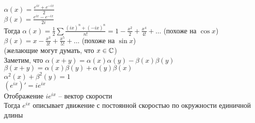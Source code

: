 \documentclass[12pt]{article}
\begin{document}
$\alpha(x) = \frac{e^{ix}+e^{-ix}}{2}$\\
$\beta(x) = \frac{e^{ix}-e^{-ix}}{2i}$\\
Тогда $\alpha(x) = \frac12 \sum\frac{(ix)^n+(-ix)^n}{n!} = 1 - \frac{x^2}{2} + \frac{x^4}{4!} + \ldots$ (похоже на $\cos x$)\\
$\beta(x) = x - \frac{x^3}{3!} + \frac{x^5}{5!}  + \ldots$ (похоже на $\sin x$)\\
(желающие могут думать, что $x\in \mathbb{C}$)\\
Заметим, что $\alpha(x+y) = \alpha(x)\alpha(y) - \beta(x)\beta(y)$\\
$\beta(x+y) = \alpha(x)\beta(y) + \alpha(y)\beta(x)$\\
$\alpha^2(x) + \beta^2(y) = 1$\\
$(e^{ix})' = ie^{ix}$\\
Отображение $ie^{ix}$ -- вектор скорости\\
Тогда $e^{ix}$ описывает движение с постоянной скоростью по окружности единичной длины\\
\end{document}
